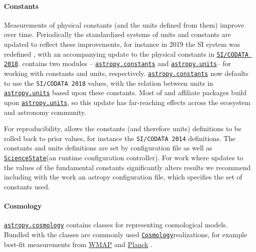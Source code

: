\documentclass[modern]{aastex631}
\newcommand{\astropysubpkg}[1]{\href{http://docs.astropy.org/en/stable/#1/index.html}{\texttt{astropy.#1}}\xspace}
\newcommand{\astropycosmology}{\astropysubpkg{cosmology}}
\newcommand{\astropyunits}{\astropysubpkg{units}}
\newcommand{\astropyconstants}{\astropysubpkg{constants}}
\newcommand{\astropyapi}[2]{\href{https://docs.astropy.org/en/stable/api/astropy.#1.html}{#2}}
\newcommand{\astropyapidoc}[2]{\astropyapi{#1}{\texttt{#2}\xspace}}
\newcommand{\astropyCosmology}{\astropyapidoc{cosmology.Cosmology}{Cosmology}}
\newcommand{\astropyScienceState}{\astropyapidoc{utils.state.ScienceState}{ScienceState}}
\begin{document}
  \paragraph{Constants}

    Measurements of physical constants (and the units defined from them) improve
    over time. Periodically the standardized systems of units and constants are
    updated to reflect these improvements, for instance in 2019 the SI system was
    redefined \citep{NIST2019}, with an accompanying update to the physical
    constants in
    \href{https://codata.org/initiatives/data-science-and-stewardship/fundamental-physical-constants/}{\texttt{SI/CODATA
    2018}}. \astropypkg contains two modules -- \astropyconstants and
    \astropyunits -- for working with constants and units, respectively.
    \astropyconstants now defaults to use the \texttt{SI/CODATA 2018} values, with
    the relation between units in \astropyunits based upon these constants. Most
    of \astropypkg and affiliate packages build upon \astropyunits, so this update
    has far-reaching effects across the \astropy ecosystem and astronomy
    community.

    For reproducibility, \astropypkg allows the constants (and therefore units)
    definitions to be rolled back to prior values, for instance the
    \texttt{SI/CODATA 2014} definitions.
    The constants and units definitions are set by configuration file as well as
    \astropyScienceState (an runtime configuration controller). For work where
    updates to the values of the fundamental constants significantly alters
    results we recommend including with the work an astropy configuration file,
    which specifies the set of constants used.

  \paragraph{Cosmology}

    \astropycosmology contains classes for representing cosmological models.
    Bundled with the classes are commonly used \astropyCosmology realizations, for
    example best-fit measurements from
    \href{https://lambda.gsfc.nasa.gov/product/map/current/}{WMAP}
    \citep{WMAP2003} and \href{https://www.nasa.gov/mission_pages/planck}{Planck}
    \citep{PlanckMission:2006}.
\end{document}
